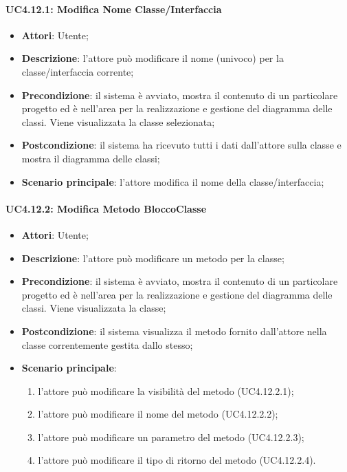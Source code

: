 \paragraph{UC4.12.1: Modifica Nome Classe/Interfaccia}
\label{UC4.12.1}
\begin{itemize}
	\item \textbf{Attori}: Utente;
	\item \textbf{Descrizione}: l'attore può modificare il nome (univoco) per la classe/interfaccia corrente;
	\item \textbf{Precondizione}: il sistema è avviato, mostra il contenuto di un particolare progetto ed è nell'area per la realizzazione e gestione del diagramma delle classi. Viene visualizzata la classe selezionata;
	\item \textbf{Postcondizione}: il sistema ha ricevuto tutti i dati dall'attore sulla classe e mostra il diagramma delle classi;
	\item \textbf{Scenario principale}: l'attore modifica il nome della classe/interfaccia;
\end{itemize}

\paragraph{UC4.12.2: Modifica Metodo BloccoClasse}
\label{UC4.12.2}
\begin{itemize}
	\item \textbf{Attori}: Utente;
	\item \textbf{Descrizione}: l'attore può modificare un metodo per la classe;
	\item \textbf{Precondizione}:  il sistema è avviato, mostra il contenuto di un particolare progetto ed è nell'area per la realizzazione e gestione del diagramma delle classi. Viene visualizzata la classe;
	\item \textbf{Postcondizione}: il sistema visualizza il metodo fornito dall'attore nella classe correntemente gestita dallo stesso;
	\item \textbf{Scenario principale}:
	\begin{enumerate}
		\item l'attore può modificare la visibilità del metodo (UC4.12.2.1);
		\item l'attore può modificare il nome del metodo (UC4.12.2.2);
		\item l'attore può modificare un parametro del metodo (UC4.12.2.3);
		\item l'attore può modificare il tipo di ritorno del metodo (UC4.12.2.4).
	\end{enumerate}
\end{itemize}

